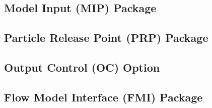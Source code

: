 %

\newpage
\subsection{Model Input (MIP) Package}


\newpage
\subsection{Particle Release Point (PRP) Package}


\newpage
\subsection{Output Control (OC) Option}


\newpage
\subsection{Flow Model Interface (FMI) Package}

